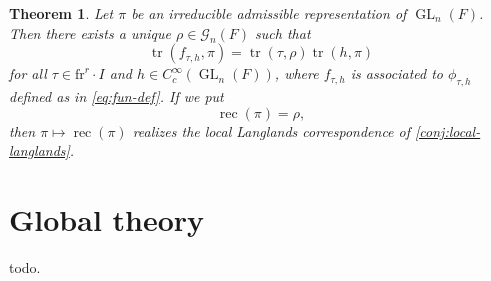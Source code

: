 \documentclass{article}
\DeclareMathOperator{\GL}{GL}
\DeclareMathOperator{\reciprocity}{rec}
\DeclareMathOperator{\trace}{tr}
\newcommand{\frob}{\mathrm{fr}} %
\newcommand{\cG}{\mathcal{G}}
\newtheorem{theorem}[subsection]{Theorem}
\begin{document}
\begin{theorem}
Let $\pi$ be an irreducible admissible representation of $\GL_n(F)$. Then there 
exists a unique $\rho\in \cG_n(F)$ such that 
\[
  \trace(f_{\tau,h},\pi) = \trace(\tau,\rho)\trace(h,\pi) 
\]
for all $\tau\in \frob^r\cdot I$ and $h\in C_c^\infty(\GL_n(F))$, where 
$f_{\tau,h}$ is associated to $\phi_{\tau,h}$ defined as in 
\eqref{eq:fun-def}. If we put 
\[
  \reciprocity(\pi) = \rho ,
\]
then $\pi\mapsto \reciprocity(\pi)$ realizes the local Langlands correspondence 
of \autoref{conj:local-langlands}. 
\end{theorem}





\section{Global theory}

todo. 





\printbibliography
\end{document}
